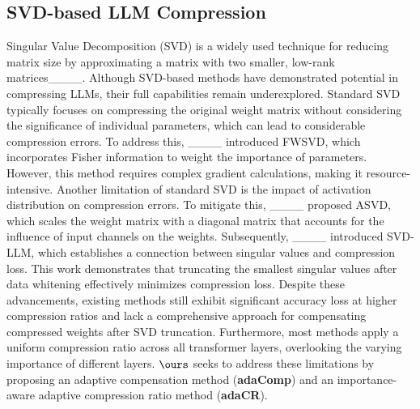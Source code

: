 	\subsection{SVD-based LLM Compression}
	\vspace{-1.2mm}
	Singular Value Decomposition (SVD) is a widely used technique for reducing matrix size by approximating a matrix with two smaller, low-rank matrices____. Although SVD-based methods have demonstrated potential in compressing LLMs, their full capabilities remain underexplored. Standard SVD typically focuses on compressing the original weight matrix without considering the significance of individual parameters, which can lead to considerable compression errors. To address this, ____ introduced FWSVD, which incorporates Fisher information to weight the importance of parameters. However, this method requires complex gradient calculations, making it resource-intensive. Another limitation of standard SVD is the impact of activation distribution on compression errors. To mitigate this, ____ proposed ASVD, which scales the weight matrix with a diagonal matrix that accounts for the influence of input channels on the weights. Subsequently, ____ introduced SVD-LLM, which establishes a connection between singular values and compression loss. This work demonstrates that truncating the smallest singular values after data whitening effectively minimizes compression loss. Despite these advancements, existing methods still exhibit significant accuracy loss at higher compression ratios and lack a comprehensive approach for compensating compressed weights after SVD truncation. Furthermore, most methods apply a uniform compression ratio across all transformer layers, overlooking the varying importance of different layers. $\ours$ seeks to address these limitations by proposing an adaptive compensation method (\textbf{adaComp}) and an importance-aware adaptive compression ratio method (\textbf{adaCR}).
	
	
	\vspace{-2.5mm}